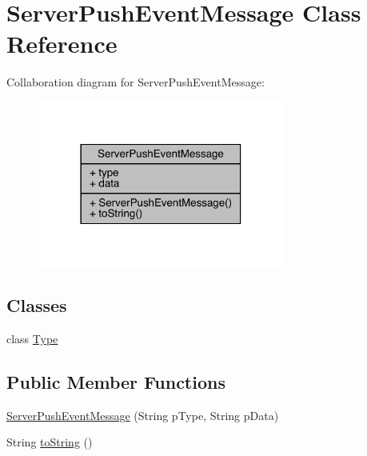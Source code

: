 \hypertarget{classcom_1_1toast_1_1android_1_1gamebase_1_1serverpush_1_1_server_push_event_message}{}\section{Server\+Push\+Event\+Message Class Reference}
\label{classcom_1_1toast_1_1android_1_1gamebase_1_1serverpush_1_1_server_push_event_message}


Collaboration diagram for Server\+Push\+Event\+Message\+:\nopagebreak
\begin{figure}[H]
\begin{center}
\leavevmode
\includegraphics[width=230pt]{classcom_1_1toast_1_1android_1_1gamebase_1_1serverpush_1_1_server_push_event_message__coll__graph}
\end{center}
\end{figure}
\subsection*{Classes}
\begin{DoxyCompactItemize}
\item 
class \hyperlink{classcom_1_1toast_1_1android_1_1gamebase_1_1serverpush_1_1_server_push_event_message_1_1_type}{Type}
\end{DoxyCompactItemize}
\subsection*{Public Member Functions}
\begin{DoxyCompactItemize}
\item 
\hyperlink{classcom_1_1toast_1_1android_1_1gamebase_1_1serverpush_1_1_server_push_event_message_ac59122f9760aa38ccfec2c3871173fd4}{Server\+Push\+Event\+Message} (String p\+Type, String p\+Data)
\item 
String \hyperlink{classcom_1_1toast_1_1android_1_1gamebase_1_1serverpush_1_1_server_push_event_message_ad146fa8579a5f8a876c4688cc5a68520}{to\+String} ()
\end{DoxyCompactItemize}
